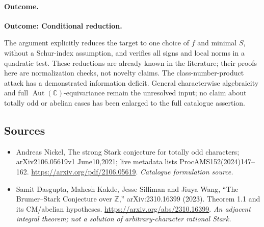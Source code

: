 \documentclass[11pt,a4paper]{article}
\newcommand{\Z}{\mathbb{Z}}
\newcommand{\C}{\mathbb{C}}
\numberwithin{equation}{section}
\begin{document}
\paragraph{Outcome.}
\textbf{Outcome: Conditional reduction.}

The argument explicitly reduces the target to one choice of $f$ and
minimal $S$, without a Schur-index assumption, and verifies all signs
and local norms in a quadratic test. These reductions are already
known in the literature; their proofs here are normalization checks,
not novelty claims. The class-number-product attack has a demonstrated
information deficit. General characterwise algebraicity and full
$\operatorname{Aut}(\C)$-equivariance remain the unresolved input; no
claim about totally odd or abelian cases has been enlarged to the full
catalogue assertion.
\subsection{Sources}
\begin{itemize}\raggedright
\item[\textnormal{[S1]}]\hypertarget{source:166:1}{} Andreas Nickel, The strong Stark conjecture for totally odd characters; arXiv2106.05619v1 June10,2021; live metadata lists ProcAMS152(2024)147–162.
\url{https://arxiv.org/pdf/2106.05619}.
{\small\textit{Catalogue formulation source.}}
\item[\textnormal{[E1]}]\hypertarget{extra:166:1}{} Samit Dasgupta, Mahesh Kakde, Jesse Silliman and Jiuya Wang, ``The Brumer--Stark Conjecture over $\Z$,'' arXiv:2310.16399 (2023). Theorem 1.1 and its CM/abelian hypotheses.
\url{https://arxiv.org/abs/2310.16399}.
{\small\textit{An adjacent integral theorem; not a solution of arbitrary-character rational Stark.}}
\end{itemize}
\end{document}
